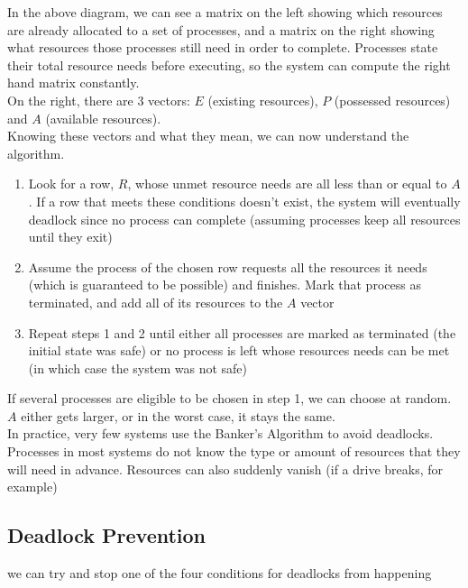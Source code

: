 \documentclass{article}
\begin{document}
In the above diagram, we can see a matrix on the left showing which resources are already allocated to a set of processes, and a matrix on the right showing what resources those processes still need in order to complete. Processes state their total resource needs before executing, so the system can compute the right hand matrix constantly.
\\On the right, there are 3 vectors: $E$ (existing resources), $P$ (possessed resources) and $A$ (available resources).
\\Knowing these vectors and what they mean, we can now understand the algorithm.
\begin{enumerate}
	\item Look for a row, $R$, whose unmet resource needs are all less than or equal to $A$. If a row that meets these conditions doesn't exist, the system will eventually deadlock since no process can complete (assuming processes keep all resources until they exit)
	\item Assume the process of the chosen row requests all the resources it needs (which is guaranteed to be possible) and finishes. Mark that process as terminated, and add all of its resources to the $A$ vector
	\item Repeat steps 1 and 2 until either all processes are marked as terminated (the initial state was safe) or no process is left whose resources needs can be met (in which case the system was not safe)
\end{enumerate}
If several processes are eligible to be chosen in step 1, we can choose at random. $A$ either gets larger, or in the worst case, it stays the same.
\\In practice, very few systems use the Banker's Algorithm to avoid deadlocks. Processes in most systems do not know the type or amount of resources that they will need in advance. Resources can also suddenly vanish (if a drive breaks, for example)
\subsection*{Deadlock Prevention} 
we can try and stop one of the four conditions for deadlocks from happening
\end{document}
